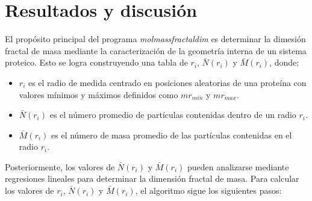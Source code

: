 \chapter{Resultados y discusión}

El propósito principal del programa \textit{molmassfractaldim} es determinar la dimesi\'{o}n fractal de masa mediante la caracterizaci\'{o}n de la geometría interna de un sistema proteico. Esto se logra construyendo una tabla de \(r_i\), \( \bar{N}(r_i)\) y \( \bar{M}(r_i)\), donde;

\begin{itemize}
	\item \(r_i\) es el radio de medida centrado en posiciones aleatorias de una prote\'{i}na con valores m\'{i}nimos y m\'{a}ximos definidos como \(mr_{min}\) y \(mr_{max}\).
	\item \( \bar{N}(r_i)\) es el número promedio de partículas contenidas dentro de un radio \(r_i\). 
	\item  \( \bar{M}(r_i)\) es el n\'{u}mero de masa promedio de las part\'{i}culas contenidas en el radio \(r_i\).
\end{itemize}

Posteriormente, los valores de \( \bar{N}(r_i) \) y \( \bar{M}(r_i)\) pueden analizarse mediante regresiones lineales para determinar la dimensi\'{o}n fractal de masa. Para calcular los valores de \(r_i\), \( \bar{N}(r_i)\) y \( \bar{M}(r_i)\), el algoritmo sigue los siguientes pasos:


